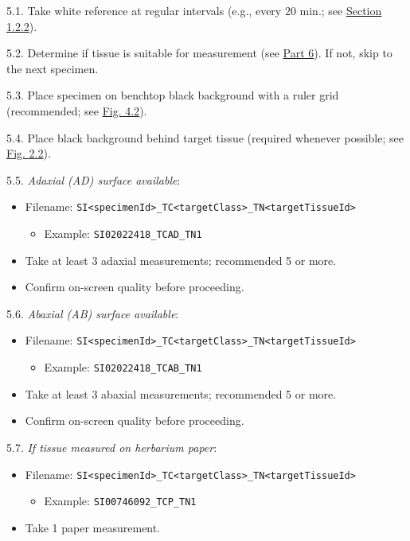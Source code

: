 \documentclass[
  letterpaper,
  DIV=11,
  numbers=noendperiod]{scrreprt}
\providecommand{\tightlist}{%
  \setlength{\itemsep}{0pt}\setlength{\parskip}{0pt}}
\begin{document}
5.1. Take white reference at regular intervals (e.g., every 20 min.; see
\hyperref[white-reference-and-background-measurements]{Section 1.2.2}).

5.2. Determine if tissue is suitable for measurement (see
\href{part6-guidelines.qmd}{Part 6}). If not, skip to the next specimen.

5.3. Place specimen on benchtop black background with a ruler grid
(recommended; see \hyperref[f4-2]{Fig. 4.2}).

5.4. Place black background behind target tissue (required whenever
possible; see \hyperref[f2-2]{Fig. 2.2}).

5.5. \emph{Adaxial (AD) surface available}:

\begin{itemize}
\tightlist
\item
  Filename:
  \texttt{SI\textless{}specimenId\textgreater{}\_TC\textless{}targetClass\textgreater{}\_TN\textless{}targetTissueId\textgreater{}}

  \begin{itemize}
  \tightlist
  \item
    Example: \texttt{SI02022418\_TCAD\_TN1}
  \end{itemize}
\item
  Take at least 3 adaxial measurements; recommended 5 or more.
\item
  Confirm on-screen quality before proceeding.
\end{itemize}

5.6. \emph{Abaxial (AB) surface available}:

\begin{itemize}
\tightlist
\item
  Filename:
  \texttt{SI\textless{}specimenId\textgreater{}\_TC\textless{}targetClass\textgreater{}\_TN\textless{}targetTissueId\textgreater{}}

  \begin{itemize}
  \tightlist
  \item
    Example: \texttt{SI02022418\_TCAB\_TN1}
  \end{itemize}
\item
  Take at least 3 abaxial measurements; recommended 5 or more.
\item
  Confirm on-screen quality before proceeding.
\end{itemize}

5.7. \emph{If tissue measured on herbarium paper}:

\begin{itemize}
\tightlist
\item
  Filename:
  \texttt{SI\textless{}specimenId\textgreater{}\_TC\textless{}targetClass\textgreater{}\_TN\textless{}targetTissueId\textgreater{}}

  \begin{itemize}
  \tightlist
  \item
    Example: \texttt{SI00746092\_TCP\_TN1}
  \end{itemize}
\item
  Take 1 paper measurement.
\end{itemize}
\end{document}
